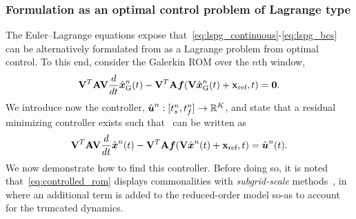\subsubsection{Formulation as an optimal control problem of Lagrange type}\label{sec:optimal_control} The
Euler--Lagrange equations expose that~\eqref{eq:lspg_continuous}-\eqref{eq:lspg_bcs} can be alternatively formulated from as a Lagrange
problem from optimal control. To this end, consider the Galerkin ROM over the $n$th window, 
$$ \basisspace^T \stweightingMatArgt{n}{t} \basisspace
\frac{d}{dt} \genstateGalerkinArg{n}{t} - \basisspace^T \stweightingMatArgt{n}{t}
\velocity(\basisspace \genstateGalerkinArg{n}{t} + \stateIntercept,t) = \boldsymbol 0.$$
We introduce now the controller, $\controllerArgnt{n} :  [\timeStartArg{n},\timeEndArg{n}] \rightarrow
\RR{\romdim}$,
and state that a residual minimizing controller exists such that \methodAcronym\ can be written as 
\begin{equation}\label{eq:controlled_rom}
 \basisspace^T
\stweightingMatArgt{n}{t} \basisspace \frac{d}{dt}\genstateArg{n}{t}  - \basisspace^T
\stweightingMatArgt{n}{t}\velocity(\basisspace \genstateArg{n}{t} +
\stateIntercept,t) = \controllerArg{n}{t}. 
 \end{equation}
We now demonstrate how to find this controller.
Before doing so, it is noted that~\eqref{eq:controlled_rom} displays commonalities with \textit{subgrid-scale}
methods~\cite{iliescu_pod_eddyviscosity,iliescu_vms_pod_ns,iliescu_ciazzo_residual_rom,parish_apg,wentland_apg,Wang:269133,San2018},
in where an additional term is added to the reduced-order model so-as to
account for the truncated dynamics. 

